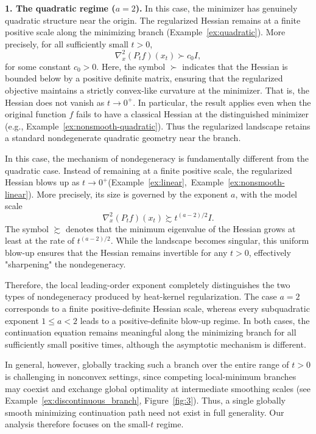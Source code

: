 \documentclass{article}
\begin{document}
\noindent
{\bf 1. The quadratic regime ($a=2$).}
In this case, the minimizer has genuinely quadratic structure near the origin. The regularized Hessian remains at a finite positive scale along the minimizing branch (Example~\ref{ex:quadratic}). More precisely, for all sufficiently small $t>0$,
$$\nabla_x^2(P_t f)(x_t) \succ c_0 I,$$
for some constant $c_0>0$. Here, the symbol $\succ$ indicates that the Hessian is bounded below by a positive definite matrix, ensuring that the regularized objective maintains a strictly convex-like curvature at the minimizer. That is, the Hessian does not vanish as $t\to0^+$. In particular, the result applies even when the original function $f$ fails to have a classical Hessian at the distinguished minimizer (e.g., Example~\ref{ex:nonsmooth-quadratic}). Thus the regularized landscape retains a standard nondegenerate quadratic geometry near the branch.

In this case, the mechanism of nondegeneracy is fundamentally different from the quadratic case. Instead of remaining at a finite positive scale, the regularized Hessian blows up as $t\to0^+$(Example~\ref{ex:linear},~Example~\ref{ex:nonsmooth-linear}). More precisely, its size is governed by the exponent $a$, with the model scale
$$\nabla_x^2(P_t f)(x_t) \succsim t^{(a-2)/2}I.$$
The symbol $\succsim$ denotes that the minimum eigenvalue of the Hessian grows at least at the rate of $t^{(a-2)/2}$. While the landscape becomes singular, this uniform blow-up ensures that the Hessian remains invertible for any $t>0$, effectively "sharpening" the nondegeneracy. 

Therefore, the local leading-order exponent completely distinguishes the two types of nondegeneracy produced by heat-kernel regularization. The case $a=2$ corresponds to a finite positive-definite Hessian scale, whereas every subquadratic exponent $1\le a<2$ leads to a positive-definite blow-up regime. In both cases, the continuation equation remains meaningful along the minimizing branch for all sufficiently small positive times, although the asymptotic mechanism is different.

In general, however, globally tracking such a branch over the entire range of $t>0$ is challenging in nonconvex settings, since competing local-minimum branches may coexist and exchange global optimality at intermediate smoothing scales (see Example~\ref{ex:discontinuous_branch}, Figure~\ref{fig:3}). Thus, a single globally smooth minimizing continuation path need not exist in full generality. Our analysis therefore focuses on the small-$t$ regime. 
\end{document}
